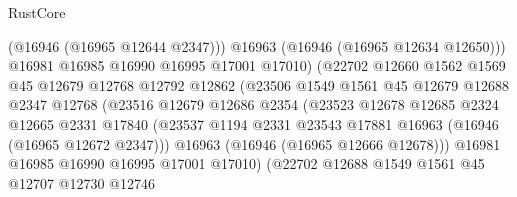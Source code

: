 \begin{lexlean}{RustCore}
\begin{coremodule}
                                    (@16946 (@16965 @12644 @2347)))
                                  @16963
                                  (@16946 (@16965 @12634 @12650)))
                                @16981
                                @16985
                                @16990
                                @16995
                                @17001
                                @17010)
                              (@22702
                                @12660
                                @1562
                                @1569
                                @45
                                @12679
                                @12768
                                @12792
                                @12862
                                (@23506
                                  @1549
                                  @1561
                                  @45
                                  @12679
                                  @12688
                                  @2347
                                  @12768
                                  (@23516
                                    @12679
                                    @12686
                                    @2354
                                    (@23523
                                      @12678
                                      @12685
                                      @2324
                                      @12665
                                      @2331
                                      @17840
                                      (@23537
                                        @1194
                                        @2331
                                        @23543
                                        @17881
                                        @16963
                                        (@16946 (@16965 @12672 @2347)))
                                      @16963
                                      (@16946 (@16965 @12666 @12678)))
                                    @16981
                                    @16985
                                    @16990
                                    @16995
                                    @17001
                                    @17010)
                                  (@22702
                                    @12688
                                    @1549
                                    @1561
                                    @45
                                    @12707
                                    @12730
                                    @12746

\end{coremodule}
\end{lexlean}
